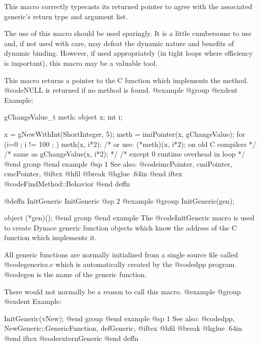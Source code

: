 {{{{This macro correctly typecasts its returned pointer to agree with
the associated generic's return type and argument list.

The use of this macro should be used sparingly.  It is a little
cumbersome to use and, if not used with care, may defeat the dynamic
nature and benefits of dynamic binding.  However, if used appropriately
(in tight loops where efficiency is important), this macro may be
a valuable tool.

This macro returns a pointer to the C function which implements the method.
@code{NULL} is returned if no method is found.
@example
@group
@exdent Example:

gChangeValue_t    meth;
object  x;
int     i;

x = gNewWithInt(ShortInteger, 5);
meth = imiPointer(x, gChangeValue);
for (i=0 ; i != 100 ; )
        meth(x, i*2);
/* or use:  (*meth)(x, i*2);  on old C compilers */
/* same as gChangeValue(x, i*2);  */
/* except 0 runtime overhead in loop          */
@end group
@end example
@sp 1
See also:  @code{imcPointer, cmiPointer, cmcPointer,}
@iftex
@hfil @break @hglue .64in         
@end iftex
@code{FindMethod::Behavior}
@end deffn











@deffn {InitGeneric} InitGeneric
@sp 2
@example
@group
InitGeneric(gen);

object  (*gen)();
@end group
@end example
The @code{InitGeneric} macro is used to create Dynace generic function
objects which know the address of the C function which implements it.

All generic functions are normally initialized from a single source file
called @code{generics.c} which is automatically created by the
@code{dpp} program.  @code{gen} is the name of the generic
function.

There would not normally be a reason to call this macro.
@example
@group
@exdent Example:

InitGeneric(vNew);
@end group
@end example
@sp 1
See also:  @code{dpp, NewGeneric::GenericFunction, defGeneric,}
@iftex
@hfil @break @hglue .64in         
@end iftex
@code{externGeneric}
@end deffn














}}}}
